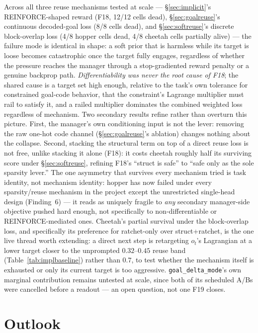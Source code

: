 \documentclass[10pt]{article}
\begin{document}
Across all three reuse mechanisms tested at scale --- \S\ref{sec:implicit}'s
REINFORCE-shaped reward (F18, 12/12 cells dead), \S\ref{sec:goalreuse}'s
continuous decoded-goal loss (8/8 cells dead), and \S\ref{sec:softreuse}'s
discrete block-overlap loss (4/8 hopper cells dead, 4/8 cheetah cells
partially alive) --- the failure mode is identical in shape: a soft prior
that is harmless while its target is loose becomes catastrophic once the
target fully engages, regardless of whether the pressure reaches the
manager through a stop-gradiented reward penalty or a genuine backprop path.
\emph{Differentiability was never the root cause of F18}; the shared cause
is a target set high enough, relative to the task's own tolerance for
constrained goal-code behavior, that the constraint's Lagrange multiplier
must rail to satisfy it, and a railed multiplier dominates the combined
weighted loss regardless of mechanism. Two secondary results refine rather
than overturn this picture. First, the manager's own conditioning input is
not the lever: removing the raw one-hot code channel (\S\ref{sec:goalreuse}'s
ablation) changes nothing about the collapse. Second, stacking the
structural term on top of a direct reuse loss is not free, unlike stacking
it alone (F18): it costs cheetah roughly half its surviving score under
\S\ref{sec:softreuse}, refining F18's ``struct is safe'' to ``safe only as
the sole sparsity lever.'' The one asymmetry that survives every mechanism
tried is task identity, not mechanism identity: hopper has now failed under
every sparsity/reuse mechanism in the project except the unrestricted
single-head design (Finding~6) --- it reads as uniquely fragile to
\emph{any} secondary manager-side objective pushed hard enough, not
specifically to non-differentiable or REINFORCE-mediated ones. Cheetah's
partial survival under the block-overlap loss, and specifically its
preference for ratchet-only over struct+ratchet, is the one live thread
worth extending: a direct next step is retargeting $o_t$'s Lagrangian at a
lower target closer to the unprompted $0.32$--$0.45$ reuse band
(Table~\ref{tab:implbaseline}) rather than $0.7$, to test whether the
mechanism itself is exhausted or only its current target is too aggressive.
\texttt{goal\_delta\_mode}'s own marginal contribution remains untested at
scale, since both of its scheduled A/Bs were cancelled before a readout ---
an open question, not one F19 closes.

\section{Outlook}
\end{document}
